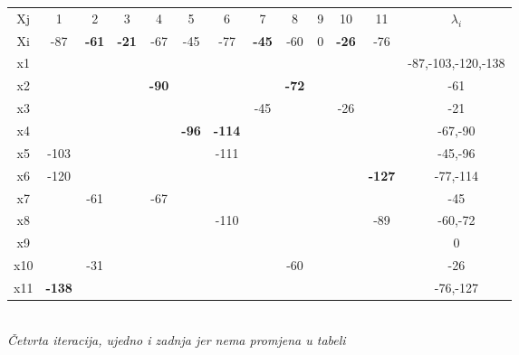 \documentclass[12pt]{article}
\begin{document}
\begin{enumerate}
\begin{center}
\begin{tabular}{|c|c|c|c|c|c|c|c|c|c|c|c|c|}
\hline
Xj & 1 & 2 & 3 & 4 & 5 & 6 & 7 & 8 & 9 & 10 & 11 & \multirow{2}{*}{$\lambda_i$} \\ \cline{1-12}
Xi & -87 & \textbf{-61} & \textbf{-21} & -67 & -45 & -77 & \textbf{-45} & -60 & 0 & \textbf{-26} & -76 &  \\ \hline
x1 &  &  &  &  &  &  &  &  &  &  &  & -87,-103,-120,-138 \\ \hline
x2 &  &  &  & \textbf{-90} &  &  &  & \textbf{-72} &  &  &  & -61 \\ \hline
x3 &  &  &  &  &  &  & -45 &  &  & -26 &  & -21 \\ \hline
x4 &  &  &  &  & \textbf{-96} & \textbf{-114} &  &  &  &  &  & -67,-90 \\ \hline
x5 & -103 &  &  &  &  & -111 &  &  &  &  &  & -45,-96 \\ \hline
x6 & -120 &  &  &  &  &  &  &  &  &  & \textbf{-127} & -77,-114 \\ \hline
x7 &  & -61 &  & -67 &  &  &  &  &  &  &  & -45 \\ \hline
x8 &  &  &  &  &  & -110 &  &  &  &  & -89 & -60,-72 \\ \hline
x9 &  &  &  &  &  &  &  &  &  &  &  & 0 \\ \hline
x10 &  & -31 &  &  &  &  &  & -60 &  &  &  & -26 \\ \hline
x11 & \textbf{-138} &  &  &  &  &  &  &  &  &  &  & -76,-127 \\ \hline
\end{tabular}

\\
\vspace{0.3cm}
\textit{Četvrta iteracija, ujedno i zadnja jer nema promjena u tabeli}



\end{center}
\end{enumerate}
\end{document}
